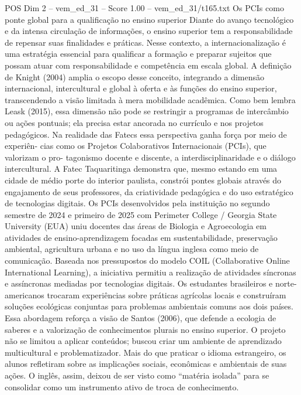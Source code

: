 \begin{textsample}{POS Dim 2 – vem\_ed\_31 – Score 1.00 – vem\_ed\_31/t165.txt}  \label{ex:f2_pos_060}
Os PCIs como ponte global para a qualificação no ensino superior Diante do avanço tecnológico e da intensa circulação de informações, o ensino superior tem a responsabilidade de repensar suas finalidades e práticas.
Nesse contexto, a internacionalização é uma estratégia essencial para qualificar a formação e preparar sujeitos que possam atuar com responsabilidade e competência em escala global.
A definição de Knight (2004) amplia o escopo desse conceito, integrando a dimensão internacional, intercultural e global à oferta e às funções do ensino superior, transcendendo a visão limitada à mera mobilidade acadêmica.
Como bem lembra Leask (2015), essa dimensão não pode se restringir a programas de intercâmbio ou ações pontuais; ela precisa estar ancorada no currículo e nos projetos pedagógicos.
Na realidade das Fatecs essa perspectiva ganha força por meio de experiên- cias como os Projetos Colaborativos Internacionais (PCIs), que valorizam o pro- tagonismo docente e discente, a interdisciplinaridade e o diálogo intercultural.
A Fatec Taquaritinga demonstra que, mesmo estando em uma cidade de médio porte do interior paulista, constrói pontes globais através do engajamento de seus professores, da criatividade pedagógica e do uso estratégico de tecnologias digitais.
Os PCIs desenvolvidos pela instituição no segundo semestre de 2024 e primeiro de 2025 com Perimeter College / Georgia State University (EUA) uniu docentes das áreas de Biologia e Agroecologia em atividades de ensino-aprendizagem focadas em sustentabilidade, preservação ambiental, agricultura urbana e no uso da língua inglesa como meio de comunicação.
Baseada nos pressupostos do modelo COIL (Collaborative Online International Learning), a iniciativa permitiu a realização de atividades síncronas e assíncronas mediadas por tecnologias digitais.
Os estudantes brasileiros e norte-americanos trocaram experiências sobre práticas agrícolas locais e construíram soluções ecológicas conjuntas para problemas ambientais comuns aos dois países.
Essa abordagem reforça a visão de Santos (2006), que defende a ecologia de saberes e a valorização de conhecimentos plurais no ensino superior.
O projeto não se limitou a aplicar conteúdos; buscou criar um ambiente de aprendizado multicultural e problematizador.
Mais do que praticar o idioma estrangeiro, os alunos refletiram sobre as implicações sociais, econômicas e ambientais de suas ações.
O inglês, assim, deixou de ser visto como “matéria isolada” para se consolidar como um instrumento ativo de troca de conhecimento.

\end{textsample}
